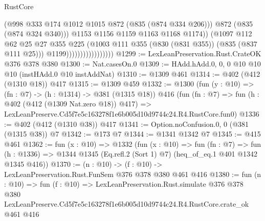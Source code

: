\begin{lexlean}{RustCore}
\begin{coremodule}
                                          (@998 @333 @174 @1012 @1015 @872 (@835 (@874 @334 @206)))
                                          @872
                                          (@835 (@874 @324 @340)))
                                        @1153
                                        @1156
                                        @1159
                                        @1163
                                        @1168
                                        @1174))
                                    (@1097
                                      @112
                                      @62
                                      @25
                                      @27
                                      @355
                                      @225
                                      (@1003 @111 @355 (@830 (@831 @355)) (@835 (@837 @111 @25)))
                                      @1199)))))))))))))))))
@1299 := LexLeanPreservation.Rust.CrateOK @376 @378 @380
@1300 := Nat.casesOn.{0}
@1309 := HAdd.hAdd.{0, 0, 0} @10 @10 @10 (instHAdd.{0} @10 instAddNat)
@1310 := @1309 @461
@1314 := @402 (@412 (@1310 @18)) @417
@1315 := @1309 @459
@1332 := @1300
    (fun (y : @10) => (fn : @7) -> (h : @1314) -> @381 (@1315 @18))
    @416
    (fun (fn : @7) =>
    fun (h : @402 (@412 (@1309 Nat.zero @18)) @417) =>
    LexLeanPreserve.Cd5f7e5c163278f1e6b005d10d9744c24.R4.RustCore.fun0)
@1336 := @402 (@412 (@1310 @38)) @417
@1341 := Option.noConfusion.{0, 0} (@381 (@1315 @38)) @7
@1342 := @173 @7
@1344 := @1341 @1342 @7
@1345 := @415 @461
@1362 := fun (x : @10) =>
  @1332
    (fun (x : @10) =>
    fun (fn : @7) =>
    fun (h : @1336) => @1344 @1345 (Eq.refl.{2} (Sort 1) @7) (heq_of_eq.{1} @401 @1342 @1345 @416))
@1370 := (n : @10) -> (f : @10) -> LexLeanPreservation.Rust.FunSem @376 @378 @380 @461 @416
@1380 := fun (n : @10) =>
  fun (f : @10) =>
  LexLeanPreservation.Rust.simulate
    @376
    @378
    @380
    LexLeanPreserve.Cd5f7e5c163278f1e6b005d10d9744c24.R4.RustCore.crate_ok
    @461
    @416
\end{coremodule}
\end{lexlean}
